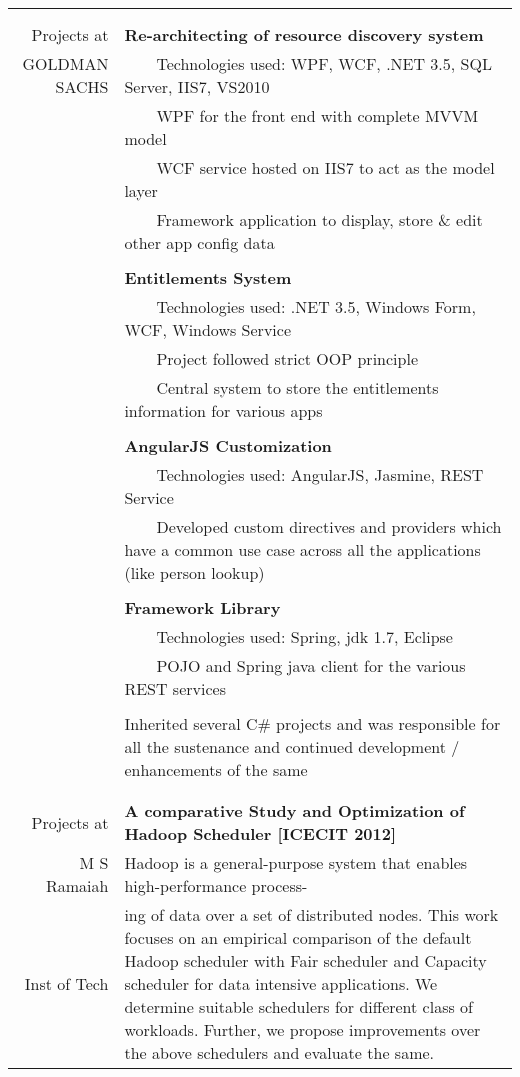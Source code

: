 \documentclass[a4paper,10pt]{article} %
\newcommand{\tabitem}{~~\llap{\textbullet}~~}
\begin{document}
\begin{tabular}{rp{13cm}}
&\\
&\\
Projects at  &  \textbf{Re-architecting of resource discovery system} \\
GOLDMAN SACHS &  \tabitem Technologies used: WPF, WCF, .NET 3.5, SQL Server, IIS7, VS2010 \\
& \tabitem WPF for the front end with complete MVVM model\\
& \tabitem WCF service hosted on IIS7 to act as the model layer\\
& \tabitem Framework application to display, store \& edit other app config data \\
&\\
& \textbf{Entitlements System}\\
& \tabitem Technologies used: .NET 3.5, Windows Form, WCF, Windows Service\\
& \tabitem Project followed strict OOP principle\\
& \tabitem Central system to store the entitlements information for various apps\\
&\\
& \textbf{AngularJS Customization} \\
& \tabitem Technologies used: AngularJS, Jasmine, REST Service\\
& \tabitem Developed custom directives and providers which have a common use case across all the applications (like person lookup) \\ 
&\\
& \textbf{Framework Library} \\
& \tabitem Technologies used: Spring, jdk 1.7, Eclipse\\
& \tabitem POJO and Spring java client for the various REST services \\ 
&\\
& Inherited several C\# projects and was responsible for all the sustenance and continued development / enhancements of the same\\
&\\
&\\
Projects at & \textbf{A comparative Study and Optimization of Hadoop Scheduler [ICECIT 2012]}\\ 
M S Ramaiah & \setlength{\leftskip}{0.4cm} Hadoop is a general-purpose system that enables high-performance process-\\
Inst of Tech & \setlength{\leftskip}{0.4cm}
ing  of data over a set of distributed nodes. This work focuses on an empirical comparison of the default Hadoop scheduler with Fair scheduler and Capacity scheduler for data intensive applications. We determine suitable schedulers for different class of workloads. Further, we propose improvements over the above schedulers and evaluate  the same.\\ 

\end{tabular}
\end{document}
